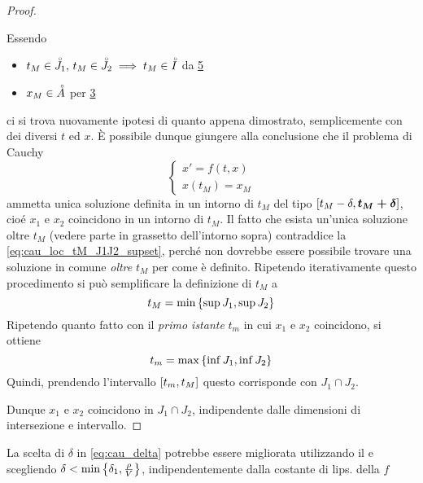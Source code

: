 \begin{theorem}
\begin{proof}
\begin{itemize}
				\begin{samepage}
					Essendo
					\begin{itemize}
						\item $t_M \in \accentset{\circ}{J_1},\,t_M \in \accentset{\circ}{J_2} \implies t_M \in \accentset{\circ}{I}$ da \hyperlink{note:diff_eq_sol_definit_set}{\notestyle{} 5 }
						\item $x_M \in \accentset{\circ}{A}$ per \hyperlink{def:equaz_diff_sol}{\notestyle{} 3 }
					\end{itemize}
				\end{samepage}
				ci si trova nuovamente ipotesi di quanto appena dimostrato, semplicemente con dei diversi $t$ ed $x$. È possibile dunque giungere alla conclusione che il problema di Cauchy
				\[
					\begin{cases}
						x'=f(t,x)\\
						x(t_M)=x_M
					\end{cases}
				\]
				ammetta unica soluzione definita in un intorno di $t_M$ del tipo $\left[t_M-\delta,\boldsymbol{t_M+\delta}\right]$, cioé $x_1$ e $x_2$ coincidono in un intorno di $t_M$. Il fatto che esista un'unica soluzione oltre $t_M$ (vedere parte in grassetto dell'intorno sopra) contraddice la \cref{eq:cau_loc_tM_J1J2_supset}, perché non dovrebbe essere possibile trovare una soluzione in comune \textit{oltre} $t_M$ per come è definito. Ripetendo iterativamente questo procedimento si può semplificare la definizione di $t_M$ a
				\[t_M = \min \left\{\sup J_1, \sup J_2\right\}\]
				Ripetendo quanto fatto con il \textit{primo istante} $t_m$ in cui $x_1$ e $x_2$ coincidono, si ottiene
				\[t_m = \max \left\{\inf J_1, \inf J_2\right\}\]
				Quindi, prendendo l'intervallo $\left[t_m,t_M\right]$ questo corrisponde con $J_1 \cap J_2$.
		\end{itemize}
		Dunque $x_1$ e $x_2$ coincidono in $J_1 \cap J_2$, indipendente dalle dimensioni di intersezione e intervallo.
	\end{proof}
	\begin{note}
		La scelta di $\delta$ in \cref{eq:cau_delta} potrebbe essere migliorata utilizzando il  e scegliendo $\delta<\min\left\{\delta_1,\frac{\rho}{V}\right\}$, indipendentemente dalla costante di lips. della $f$
	\end{note}
\end{theorem}

